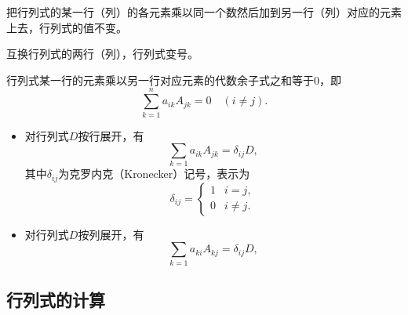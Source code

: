 \begin{frame}
  \begin{xingzhi}
    把行列式的某一行（列）的各元素乘以同一个数然后加到另一行（列）对应的元素上去，行列式的值不变。
  \end{xingzhi}
\end{frame}

\begin{frame}
  \begin{xingzhi}
    互换行列式的两行（列），行列式变号。
  \end{xingzhi}
\end{frame}

\begin{frame}
  \begin{xingzhi}
    行列式某一行的元素乘以另一行对应元素的代数余子式之和等于$0$，即
    $$
    \sum_{k=1}^n a_{ik} A_{jk}  = 0 \quad (i\ne j).
    $$
  \end{xingzhi}

  \begin{jielun}
    \begin{itemize}
    \item 对行列式$D$按行展开，有
      $$
      \sum_{k=1} a_{ik} A_{jk} = \delta_{ij} D,
      $$
      其中$\delta_{ij}$为克罗内克（Kronecker）记号，表示为
      $$
      \delta_{ij} = \left\{
        \begin{array}{ll}
          1 & i=j,\\
          0 & i\ne j.
        \end{array}
      \right.
      $$
    \item 对行列式$D$按列展开，有
      $$
      \sum_{k=1} a_{ki} A_{kj} = \delta_{ij} D,
      $$
    \end{itemize}
  \end{jielun}
\end{frame}


\subsection{行列式的计算}

